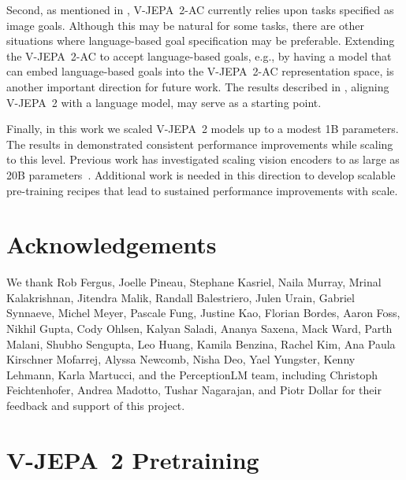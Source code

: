 \documentclass[]{kling/kling}
\newcommand{\model}{V-JEPA~2\xspace}
\newcommand{\acModel}{V-JEPA~2-AC\xspace}
\begin{document}
Second, as mentioned in , \acModel currently relies upon tasks specified as image goals. Although this may be natural for some tasks, there are other situations where language-based goal specification may be preferable. Extending the \acModel to accept language-based goals, e.g., by having a model that can embed language-based goals into the \acModel representation space, is another important direction for future work. The results described in , aligning \model with a language model, may serve as a starting point.

Finally, in this work we scaled \model models up to a modest 1B parameters. The results in  demonstrated consistent performance improvements while scaling to this level. Previous work has investigated scaling vision encoders to as large as 20B parameters~\citep{zhai2022scaling,carreira2024scaling}. Additional work is needed in this direction to develop scalable pre-training recipes that lead to sustained performance improvements with scale.

\section*{Acknowledgements}

We thank
Rob Fergus, Joelle Pineau, Stephane Kasriel, Naila Murray, Mrinal Kalakrishnan, Jitendra Malik,
Randall Balestriero, Julen Urain,
Gabriel Synnaeve, Michel Meyer, Pascale Fung, Justine Kao, Florian Bordes, Aaron Foss,
Nikhil Gupta, Cody Ohlsen, Kalyan Saladi, Ananya Saxena, Mack Ward, Parth Malani, Shubho Sengupta, Leo Huang,
Kamila Benzina, Rachel Kim,
Ana Paula Kirschner Mofarrej, Alyssa Newcomb, Nisha Deo, Yael Yungster, Kenny Lehmann, Karla Martucci,
and the PerceptionLM team, including Christoph Feichtenhofer, Andrea Madotto, Tushar Nagarajan, and Piotr Dollar
for their feedback and support of this project.



\clearpage
\newpage



\clearpage
\newpage
\beginappendix


\section{\model Pretraining}
\label{app:vjepa2_pretraining}
\end{document}
